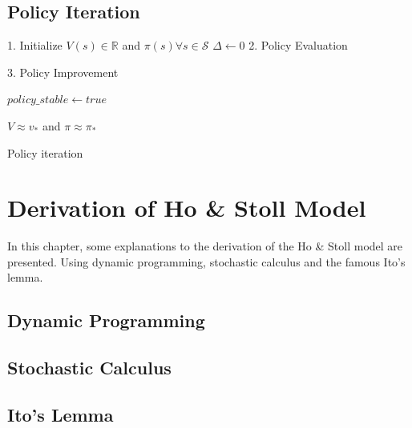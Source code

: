 \documentclass{kththesis}
\theoremstyle{definition}
\begin{document}
\section{Policy Iteration}
\LinesNumbered
\begin{algorithm}[H]
 \textsf{1. Initialize} \;
 $V(s) \in \mathbb{R}$ and  $\pi(s) \forall s\in \mathcal{S} $ \;
 $\Delta \leftarrow 0$ \;
 \textsf{2. Policy Evaluation}\;
 
 \textsf{3. Policy Improvement}\;
 
 $policy\_stable \leftarrow true$ \;
 
 \Return $V \approx v_{*}$ and $\pi \approx \pi_{*}$ \;
 \caption{Policy iteration}
 \label{alg1}
\end{algorithm}

\chapter{Derivation of Ho \& Stoll Model}\label{app:B}
In this chapter, some explanations to the derivation of the Ho \& Stoll model are presented. Using dynamic programming, stochastic calculus and the famous Ito's lemma.

\section{Dynamic Programming}

\section{Stochastic Calculus}

\section{Ito's Lemma}
\end{document}
